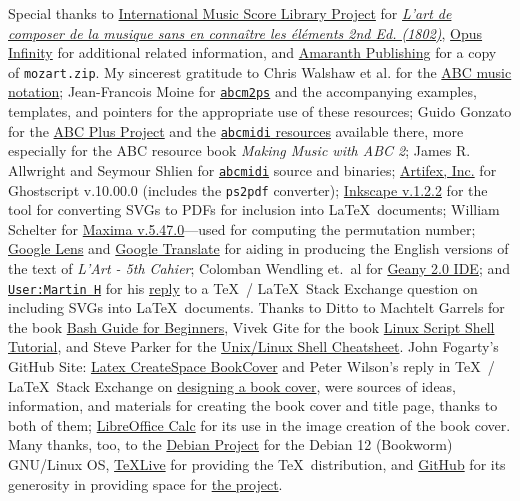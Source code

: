\documentclass[a4paper,x11names,svgnames,10pt]{article}
\begin{document}
{Special thanks to \href{https://imslp.org}{International Music Score Library Project} for \href{https://imslp.org/wiki/L'art\_de_composer\_de\_la_musique\_sans\_en\_conna\%C3\%AEtre\_les\_\%C3\%A9l\%C3\%A9ments\_(Calegari\%2C\_Antonio)}{\it L'art de composer de la musique sans en connaître les éléments  2nd Ed. (1802)}, \href{https://opus-infinity.org}{Opus Infinity} for additional related information, and \href{http://www.amaranthpublishing.com/MozartDiceGame.htm}{Amaranth Publishing} for a copy of {\tt mozart.zip}. My sincerest gratitude to Chris Walshaw et al. for the \href{http://www.abcnotation.com/}{ABC music notation}; Jean-Francois Moine for \href{http://moinejf.free.fr/}{\tt abcm2ps} and the accompanying examples, templates, and pointers for the appropriate use of these resources; Guido Gonzato for the \href{http://abcplus.sourceforge.net/}{ABC Plus Project} and the \href{http://abcplus.sourceforge.net/#abcMIDI}{{\tt abcmidi} resources} available there, more especially for the ABC resource book {\em Making Music with ABC 2}; James R. Allwright and Seymour Shlien for \href{http://abc.sourceforge.net/abcMIDI}{\tt abcmidi} source and binaries; \href{https://artifex.com/}{Artifex, Inc.} for Ghostscript v.10.00.0 (includes the {\tt ps2pdf} converter); \href{https://www.inkscape.org/}{Inkscape v.1.2.2} for the tool for converting SVGs to PDFs for inclusion into \LaTeX\ documents; William Schelter for \href{https://maxima.sourceforge.io}{Maxima v.5.47.0}---used for computing the permutation number; \href{https://google.lens}{Google Lens} and \href{https://translate.google.com}{Google Translate} for aiding in producing the English versions of the text of {\it L'Art - 5th Cahier}; Colomban Wendling et.\ al for \href{https://www.geany.org}{Geany 2.0 IDE}; and \href{https://tex.stackexchange.com/users/632/martin-h}{\tt User:Martin H} for his \href{https://tex.stackexchange.com/questions/2099/how-to-include-svg-diagrams-in-latex}{reply} to a \TeX\ / \LaTeX\ Stack Exchange question on including SVGs into \LaTeX\ documents. Thanks to  Ditto to Machtelt Garrels for the book \href{http://tldp.org/LDP/Bash-Beginners-Guide/html/Bash-Beginners-Guide.html}{Bash Guide for Beginners}, Vivek Gite for the book \href{http://www.freeos.com/guides/lsst/}{Linux Script Shell Tutorial}, and Steve Parker for the \href{http://steve-parker.org/sh/cheatsheet.pdf}{Unix/Linux Shell Cheatsheet}. John Fogarty's GitHub Site: \href{https://github.com/jfogarty/latex-createspace-bookcover}{Latex CreateSpace BookCover} and Peter Wilson's reply in  \TeX\ / \LaTeX\ Stack Exchange on \href{https://tex.stackexchange.com/questions/17579/how-can-i-design-a-book-cover}{designing a book cover}, were sources of ideas, information, and materials for creating the book cover and title page, thanks to both of them; \href{http://www.libreoffice.org/}{LibreOffice Calc} for its use in the image creation of the book cover.  Many thanks, too, to the \href{https://www.debian.org}{Debian Project} for the Debian 12 (Bookworm) GNU/Linux OS, \href{http://www.tug.org/texlive/}{TeXLive} for providing the \TeX\ distribution,  and \href{https://github.com}{GitHub} for its generosity in providing space for \href{https://github.com/justineuro/mdgBookSVG7Kit}{the project}.  

}
\end{document}
